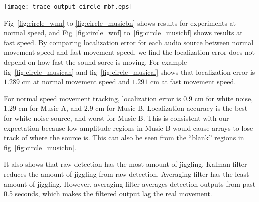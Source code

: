 \begin{figure*}[]
\centering
  \texttt{[image: trace\_output\_circle\_mbf.eps]}
  \caption{music B ($20$ cm per second)}
  \label{fig:circle_musicbf}
\end{figure*}

Fig~\ref{fig:circle_wnn} to \ref{fig:circle_musicbn} shows results for experiments at normal speed, and Fig~\ref{fig:circle_wnf} to~\ref{fig:circle_musicbf} shows results at fast speed. By comparing localization error for each audio source between normal movement speed and fast movement speed, we find the localization error does not depend on how fast the sound sorce is moving. For example fig~\ref{fig:circle_musican} and fig~\ref{fig:circle_musicaf} shows that localization error is $1.289$ cm at normal movement speed and $1.291$ cm at fast movement speed.

For normal speed movement tracking, localization error is $0.9$ cm for white noise, $1.29$ cm for Music A, and $2.9$ cm for Music B. Localization accuracy is the best for white noise source, and worst for Music B. This is consistent with our expectation because low amplitude regions in Music B would cause arrays to lose track of where the source is. This can also be seen from the ``blank'' regions in fig~\ref{fig:circle_musicbn}.

It also shows that raw detection has the most amount of jiggling. Kalman filter reduces the amount of jiggling from raw detection. Averaging filter has the least amount of jiggling. However, averaging filter averages detection outputs from past 0.5 seconds, which makes the filtered output lag the real movement. 
